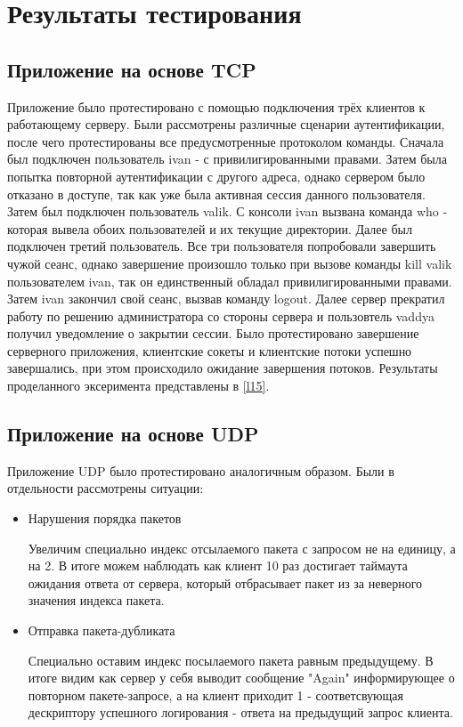 \section{Результаты тестирования}
\subsection{Приложение на основе TCP}

Приложение было протестировано с помощью подключения трёх клиентов к работающему серверу. Были рассмотрены различные сценарии аутентификации, после чего протестированы все предусмотренные протоколом команды. Сначала был подключен пользователь ivan - с привилигированными правами. Затем была попытка повторной аутентификации с другого адреса, однако сервером было отказано в доступе, так как уже была активная сессия данного пользователя. Затем был подключен пользователь valik. С консоли ivan вызвана команда who - которая вывела обоих пользователей и их текущие директории. Далее был подключен третий пользователь. Все три пользователя попробовали завершить чужой сеанс, однако завершение произошло только при вызове команды kill valik пользователем ivan, так он единственный обладал привилигированными правами. Затем ivan закончил свой сеанс, вызвав команду logout. Далее сервер прекратил работу по решению администратора со стороны сервера и пользовтель vaddya получил уведомление о закрытии сессии. Было протестировано завершение серверного приложения, клиентские сокеты и клиентские потоки успешно завершались, при этом происходило ожидание завершения потоков. Результаты проделанного эксеримента представлены в \ref{l15}. 



\subsection{Приложение на основе UDP}

Приложение UDP было протестировано аналогичным образом. Были в отдельности рассмотрены ситуации:
\begin{itemize}
\item Нарушения порядка пакетов



Увеличим специально индекс отсылаемого пакета с запросом не на единицу, а на 2. В итоге можем наблюдать как клиент 10 раз достигает таймаута ожидания ответа от сервера, который отбрасывает пакет из за неверного значения индекса пакета.

\item Отправка пакета-дубликата



Специально оставим индекс посылаемого пакета равным предыдущему. В итоге видим как сервер у себя выводит сообщение "Again" информирующее о повторном пакете-запросе, а на клиент приходит 1 - соответсвующая дескриптору успешного логирования - ответа на предыдущий запрос клиента.
\end{itemize}


